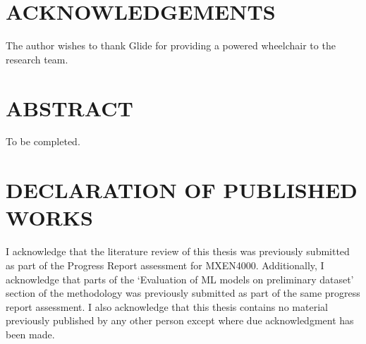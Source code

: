 \documentclass[12pt,twoside]{article}
\begin{document}

\thispagestyle{empty}\null\clearpage


\thispagestyle{empty}\null\clearpage

\section*{ACKNOWLEDGEMENTS}
The author wishes to thank Glide for providing a powered wheelchair to the research team.
\cleardoublepage

\section*{ABSTRACT}
To be completed.



\cleardoublepage

\section*{DECLARATION OF PUBLISHED WORKS}
I acknowledge that the literature review of this thesis was previously submitted as part of the Progress Report assessment for MXEN4000.
Additionally, I acknowledge that parts of the `Evaluation of ML models on preliminary dataset'
section of the methodology was previously submitted as part of the same progress report assessment.
I also acknowledge that this thesis contains no material previously
published by any other person except where due acknowledgment has been made.
\end{document}
